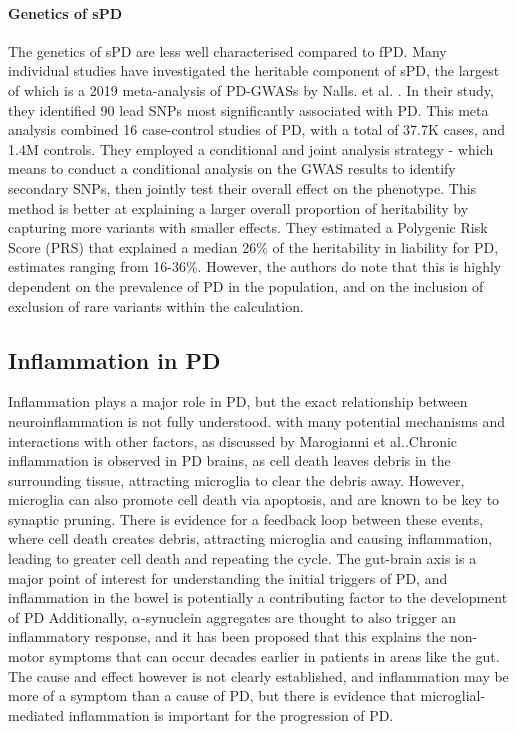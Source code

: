 \documentclass{article}
\begin{document}
\paragraph{Genetics of sPD}The genetics of sPD are less well characterised compared to fPD. Many individual studies have investigated the heritable component of sPD, the largest of which is a 2019 meta-analysis of PD-GWASs by Nalls. et al. \cite{Nalls2019IdentificationStudies}. In their study, they identified 90 lead SNPs most significantly associated with PD. This meta analysis combined 16 case-control studies of PD, with a total of 37.7K cases, and 1.4M controls. They employed a conditional and joint analysis strategy - which means to conduct a conditional analysis on the GWAS results to identify secondary SNPs, then jointly test their overall effect on the phenotype\cite{Yang2012ConditionalTraits}. This method is better at explaining a larger overall proportion of heritability by capturing more variants with smaller effects. They estimated a Polygenic Risk Score (PRS) that explained a median 26\% of the heritability in liability for PD, estimates ranging from 16-36\%. However, the authors do note that this is highly dependent on the prevalence of PD in the population, and on the inclusion of exclusion of rare variants within the calculation.
\subsection{Inflammation in PD}
Inflammation plays a major role in PD, but the exact relationship between neuroinflammation is not fully understood. with many potential mechanisms and interactions with other factors, as discussed by Marogianni et al.\cite{Marogianni2020NeurodegenerationDisease}.Chronic inflammation is observed in PD brains, as cell death leaves debris in the surrounding tissue, attracting microglia to clear the debris away\cite{Pajares2020InflammationImplications}. However, microglia can also promote cell death via apoptosis, and are known to be key to synaptic pruning. There is evidence for a feedback loop between these events, where cell death creates debris, attracting microglia and causing inflammation, leading to greater cell death and repeating the cycle.
The gut-brain axis is a major point of interest for understanding the initial triggers of PD, and inflammation in the bowel is potentially a contributing factor to the development of PD\cite{Marogianni2020NeurodegenerationDisease}
Additionally, $\alpha$-synuclein aggregates are thought to also trigger an inflammatory response, and it has been proposed that this explains the non-motor symptoms that can occur decades earlier in patients in areas like the gut\cite{Forloni2023AlphaInflammation}. The cause and effect however is not clearly established, and inflammation may be more of a symptom than a cause of PD\cite{Pajares2020InflammationImplications}, but there is evidence that microglial-mediated inflammation is important for the progression of PD\cite{Isik2023MicrogliaDisease}.
\end{document}
